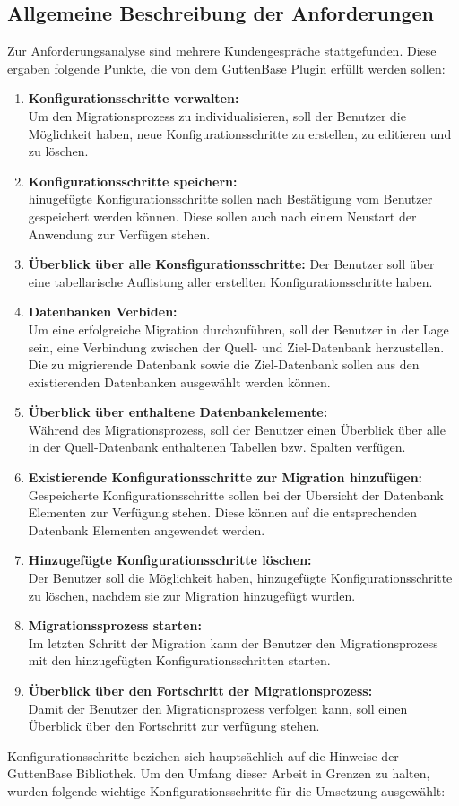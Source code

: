 \subsection{Allgemeine Beschreibung der Anforderungen}
Zur Anforderungsanalyse sind mehrere Kundengespräche stattgefunden. Diese ergaben folgende Punkte, die von dem GuttenBase Plugin erfüllt werden sollen:
\begin{enumerate}
	\item \textbf{Konfigurationsschritte verwalten:}\\
	Um den Migrationsprozess zu individualisieren, soll der Benutzer die Möglichkeit haben, neue Konfigurationsschritte zu erstellen, zu editieren und zu löschen.
	\item \textbf{Konfigurationsschritte speichern:} \\
	hinugefügte Konfigurationsschritte sollen nach Bestätigung vom Benutzer gespeichert werden können. Diese sollen auch nach einem Neustart der Anwendung zur Verfügen stehen.
	\item \textbf{Überblick über alle Konsfigurationsschritte:}
	Der Benutzer soll über eine tabellarische Auflistung aller erstellten Konfigurationsschritte haben.
	\item \textbf{Datenbanken Verbiden:} \\
	Um eine erfolgreiche Migration durchzuführen, soll der Benutzer in der Lage sein, eine Verbindung zwischen der Quell- und Ziel-Datenbank herzustellen. Die zu migrierende Datenbank sowie die Ziel-Datenbank sollen aus den existierenden Datenbanken ausgewählt werden können.
	\item \textbf{Überblick über enthaltene Datenbankelemente:}\\
	Während des Migrationsprozess, soll der Benutzer einen Überblick über alle in der Quell-Datenbank enthaltenen Tabellen bzw. Spalten verfügen.
	\item \textbf{Existierende Konfigurationsschritte zur Migration hinzufügen:}\\
	Gespeicherte Konfigurationsschritte sollen bei der Übersicht der Datenbank Elementen zur Verfügung stehen. Diese können auf die entsprechenden Datenbank Elementen angewendet werden.
	\item \textbf{Hinzugefügte Konfigurationsschritte löschen:}\\	
	Der Benutzer soll die Möglichkeit haben, hinzugefügte Konfigurationsschritte zu löschen, nachdem sie zur Migration hinzugefügt wurden.
	\item \textbf{Migrationssprozess starten:} \\
	Im letzten Schritt der Migration kann der Benutzer den Migrationsprozess mit den hinzugefügten Konfigurationsschritten starten.	
	\item \textbf{Überblick über den Fortschritt der Migrationsprozess:}\\
	Damit der Benutzer den Migrationsprozess verfolgen kann, soll einen Überblick über den Fortschritt zur verfügung stehen. 
\end{enumerate}
Konfigurationsschritte beziehen sich hauptsächlich auf die Hinweise der GuttenBase Bibliothek. Um den Umfang dieser Arbeit in Grenzen zu halten, wurden folgende wichtige Konfigurationsschritte für die Umsetzung ausgewählt:


